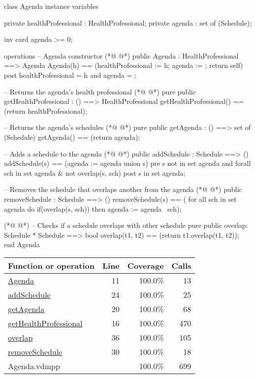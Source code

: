 \begin{vdmpp}[breaklines=true]
class Agenda
instance variables

private healthProfessional : HealthProfessional;
private agenda : set of (Schedule);

inv card agenda >= 0;

operations
 -- Agenda constructor
(*@
\label{Agenda:11}
@*)
 public Agenda : HealthProfessional ==> Agenda
  Agenda(h) == (healthProfessional := h; agenda := {}; return self)
 post healthProfessional = h and agenda = {};
 
 -- Returns the agenda's health professional
(*@
\label{getHealthProfessional:16}
@*)
 pure public getHealthProfessional : () ==> HealthProfessional
  getHealthProfessional() == (return healthProfessional);
 
 -- Returns the agenda's schedules
(*@
\label{getAgenda:20}
@*)
 pure public getAgenda : () ==> set of (Schedule)
  getAgenda() == (return agenda);
 
 -- Adds a schedule to the agenda
(*@
\label{addSchedule:24}
@*)
 public addSchedule : Schedule ==> ()
  addSchedule(s) == (agenda := agenda union {s})
 pre s not in set agenda and forall sch in set agenda & not overlap(s, sch)
 post s in set agenda;
 
 -- Removes the schedule that overlaps another from the agenda
(*@
\label{removeSchedule:30}
@*)
 public removeSchedule : Schedule ==> ()
  removeSchedule(s) == (
   for all sch in set agenda do
    if(overlap(s, sch))
     then agenda := agenda \ {sch});
 
(*@
\label{overlap:36}
@*)
 -- Checks if a schedule overlaps with other schedule
 pure public overlap: Schedule * Schedule ==> bool
  overlap(t1, t2) == (return t1.overlap(t1, t2));
end Agenda
\end{vdmpp}
\bigskip
\begin{longtable}{|l|r|r|r|}
\hline
Function or operation & Line & Coverage & Calls \\
\hline
\hline
\hyperref[Agenda:11]{Agenda} & 11&100.0\% & 13 \\
\hline
\hyperref[addSchedule:24]{addSchedule} & 24&100.0\% & 25 \\
\hline
\hyperref[getAgenda:20]{getAgenda} & 20&100.0\% & 68 \\
\hline
\hyperref[getHealthProfessional:16]{getHealthProfessional} & 16&100.0\% & 470 \\
\hline
\hyperref[overlap:36]{overlap} & 36&100.0\% & 105 \\
\hline
\hyperref[removeSchedule:30]{removeSchedule} & 30&100.0\% & 18 \\
\hline
\hline
Agenda.vdmpp & & 100.0\% & 699 \\
\hline
\end{longtable}


